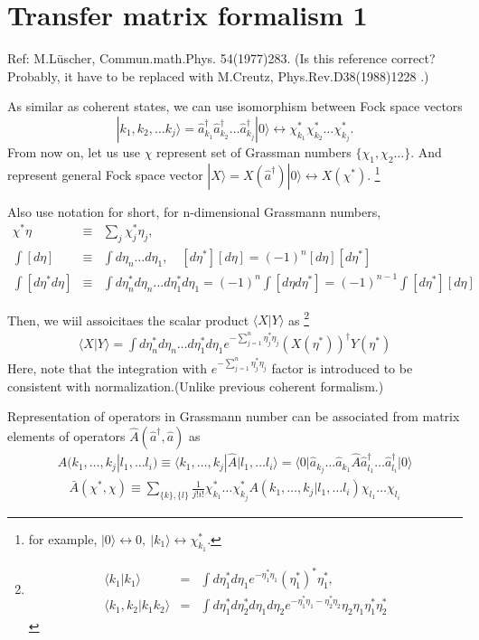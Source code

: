 \documentclass[10pt]{book}
\newcommand{\bea}{\begin{eqnarray}}
\newcommand{\eea}{\end{eqnarray}}
\newcommand{\no}{\nonumber \\}
\def\la{\langle}
\def\ra{\rangle}
\begin{document}
\section{Transfer matrix formalism 1}
Ref: M.L\"{u}scher, Commun.math.Phys. 54(1977)283. (Is this reference correct? 
Probably, it have to be replaced with M.Creutz, Phys.Rev.D38(1988)1228 .)

As similar as coherent states, we can use isomorphism between
Fock space vectors 
$$|k_1,k_2,\dots k_j\ra
=\hat{a}^\dagger_{k_1}\hat{a}^\dagger_{k_2}\dots\hat{a}^\dagger_{k_j}|0\ra \leftrightarrow \chi_{k_1}^* \chi_{k_2}^*\dots \chi_{k_j}^*.$$
From now on,
let us use $\chi$ represent set of Grassman numbers $\{\chi_1,\chi_2\dots\}$.
And represent general Fock space vector 
$|X\ra=X(\hat{a}^\dagger)|0\ra \leftrightarrow X(\chi^*)$.
\footnote{for example, 
$|0\ra\leftrightarrow 0,\ |k_1\ra\leftrightarrow \chi^*_{k_1}$.
}

Also use notation for short, for n-dimensional Grassmann numbers,
\bea 
\chi^*\eta &\equiv& \sum_{j}\chi_j^*\eta_j ,\no 
\int [d\eta]&\equiv& \int d\eta_n\dots d\eta_1,\quad  [d\eta^*][d\eta]=(-1)^n [d\eta][d\eta^*] \no 
\int [d\eta^* d\eta]&\equiv& \int d\eta^*_n d\eta_n\dots d\eta_1^* d\eta_1
  =(-1)^n \int [d\eta d\eta^*]
  =(-1)^{n-1}\int [d\eta^*][d\eta]
\eea 



Then, we wiil assoicitaes the scalar product $\la X|Y\ra$ as
\footnote{
\bea
\la k_1| k_1\ra&=&\int d\eta^*_1 d \eta_1  
   e^{-\eta^*_1 \eta_1 } (\eta_1^*)^* \eta_1^*,\no
\la k_1,k_2|k_1 k_2\ra &=&
   \int d\eta^*_1 d\eta^*_2 d\eta_1 d\eta_2 
   e^{-\eta^*_1\eta_1-\eta_2^*\eta_2} \eta_2\eta_1 \eta^*_1\eta^*_2      
\eea
}
\bea
\la X|Y\ra =\int d\eta^*_n d\eta_n \dots  d\eta^*_1 d\eta_1
            e^{-\sum_{j=1}^n \eta_j^* \eta_j}
            (X(\eta^*))^\dagger Y(\eta^*) 
\eea
Here, note that the integration with $e^{-\sum_{j=1}^n \eta_j^* \eta_j} $ factor 
is introduced to be consistent with normalization.(Unlike previous 
coherent formalism.)  



Representation of operators in Grassmann number can be associated from 
matrix elements of operators $\hat{A}(\hat{a}^\dagger,\hat{a})$ as
\bea 
A(k_1,\dots,k_j|l_1,\dots l_i)\equiv 
\la k_1,\dots,k_j|\hat{A}|l_1,\dots l_i\ra
=\la 0|\hat{a}_{k_j}\dots\hat{a}_{k_1}\hat{A}\hat{a}^\dagger_{l_1}\dots\hat{a}^\dagger_{l_i}|0\ra  
\eea 
\bea 
\bar{A}(\chi^*,\chi)\equiv 
 \sum_{\{k\},\{l\} } \frac{1}{j! i!} \chi_{k_1}^*\dots\chi_{k_j}^*
                     A(k_1,\dots,k_j|l_1,\dots l_i)\chi_{l_1}\dots\chi_{l_i}
\eea 
\end{document}
